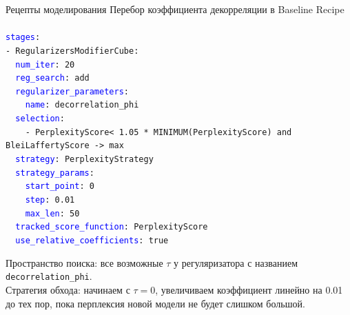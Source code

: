 \begin{frame}[t]{Рецепты моделирования}
Перебор коэффициента декорреляции в Baseline Recipe\\

\footnotesize \texttt{\\
\textcolor{blue}{stages}: \\
- RegularizersModifierCube: \\
\ \ \textcolor{blue}{num\_iter}: 20 \\
\ \ \textcolor{blue}{reg\_search}: add \\
\ \ \textcolor{blue}{regularizer\_parameters}: \\
\ \ \ \ \textcolor{blue}{name}: decorrelation\_phi \\
\ \ \textcolor{blue}{selection}: \\
\ \ \ \ - PerplexityScore\@all < 1.05 * MINIMUM(PerplexityScore\@all) and BleiLaffertyScore -> max \\
\ \ \textcolor{blue}{strategy}: PerplexityStrategy \\
\ \ \textcolor{blue}{strategy\_params}: \\
\ \ \ \ \textcolor{blue}{start\_point}: 0 \\
\ \ \ \ \textcolor{blue}{step}: 0.01 \\
\ \ \ \ \textcolor{blue}{max\_len}: 50 \\
\ \ \textcolor{blue}{tracked\_score\_function}: PerplexityScore\@all \\
\ \ \textcolor{blue}{use\_relative\_coefficients}: true	\\
}

Пространство поиска: все возможные $\tau$ у регуляризатора с названием \texttt{decorrelation\_phi}.\\

Стратегия обхода: начинаем с $\tau=0$, увеличиваем коэффициент линейно на 0.01 до тех пор, пока перплексия новой модели не будет слишком большой.
\end{frame}



